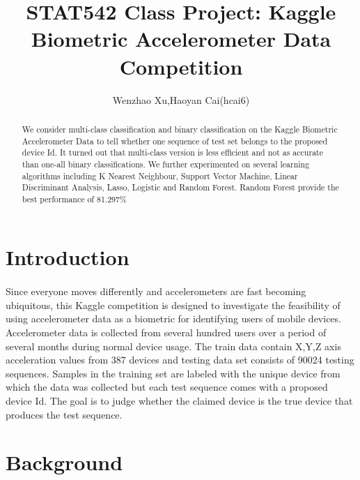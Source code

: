 \documentclass[11pt,letterpaper]{article}
\begin{document}
\title{STAT542 Class Project: Kaggle Biometric Accelerometer Data Competition}
\author{Wenzhao Xu,Haoyan Cai(hcai6)}
\maketitle





\begin{abstract}
We consider multi-class classification and binary classification on the Kaggle Biometric Accelerometer Data to tell whether one sequence of test set belongs to the proposed device Id. It turned out that multi-class version is less efficient and not as accurate than one-all binary classifications. We further experimented on several learning algorithms including K Nearest Neighbour, Support Vector Machine, Linear Discriminant Analysis, Lasso, Logistic and Random Forest. Random Forest provide the best performance of 81.297\%

\end{abstract}


\section{Introduction} 
\label{sec:introduction}
\paragraph{} Since everyone moves differently and accelerometers are fast becoming ubiquitous, this Kaggle competition is designed to investigate the feasibility of using accelerometer data as a biometric for identifying users of mobile devices. Accelerometer data is collected from several hundred users over a period of several months during normal device usage. 
 The train data contain X,Y,Z axis acceleration values from 387 devices and testing data set consists of 90024 testing sequences. Samples in the training set are labeled with the unique device from which the data was collected but each test sequence comes with a proposed device Id. The goal is to judge whether the claimed device is the true device that produces the test sequence. 
	
 

\section{Background}
\label{sec:background}
\end{document}
